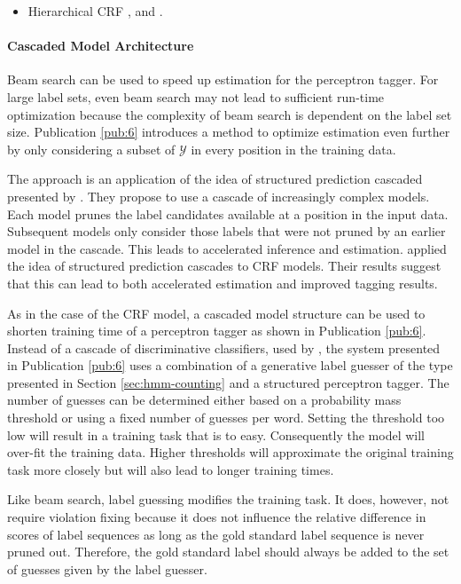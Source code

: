 \begin{itemize}
\item Hierarchical CRF \cite{Muller2013}, \cite{Weiss2010} and \cite{Charniak2005}.
\end{itemize}

\paragraph{Cascaded Model Architecture} Beam search can be used to
speed up estimation for the perceptron tagger. For large label sets,
even beam search may not lead to sufficient run-time optimization
because the complexity of beam search is dependent on the label set
size. Publication \ref{pub:6} introduces a method to optimize
estimation even further by only considering a subset of $\mathcal{Y}$
in every position in the training data.

The approach is an application of the idea of structured prediction
cascaded presented by \cite{Weiss2010}. They propose to use a cascade
of increasingly complex models. Each model prunes the label candidates
available at a position in the input data. Subsequent models only
consider those labels that were not pruned by an earlier model in the
cascade. This leads to accelerated inference and
estimation. \cite{Muller2013} applied the idea of structured
prediction cascades to CRF models. Their results suggest that this can
lead to both accelerated estimation and improved tagging results.

As in the case of the CRF model, a cascaded model structure can be
used to shorten training time of a perceptron tagger as shown in
Publication \ref{pub:6}. Instead of a cascade of discriminative
classifiers, used by \cite{Muller2013}, the system presented in
Publication \ref{pub:6} uses a combination of a generative label
guesser of the type presented in Section \ref{sec:hmm-counting} and a
structured perceptron tagger. The number of guesses can be determined
either based on a probability mass threshold or using a fixed number
of guesses per word. Setting the threshold too low will result in a
training task that is to easy. Consequently the model will over-fit the
training data. Higher thresholds will approximate the original
training task more closely but will also lead to longer training
times.

Like beam search, label guessing modifies the training task. It does,
however, not require violation fixing because it does not influence
the relative difference in scores of label sequences as long as the
gold standard label sequence is never pruned out. Therefore, the gold
standard label should always be added to the set of guesses given by
the label guesser.

